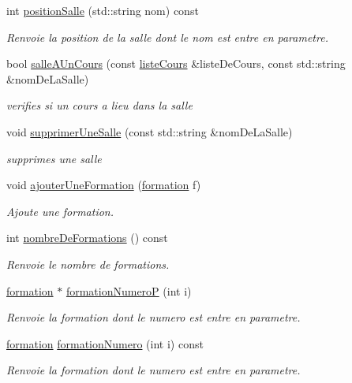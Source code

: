 \begin{DoxyCompactItemize}
int \hyperlink{classliste_ressources_ad4f9c36ed425f2a3d4ca161abd6198da}{position\+Salle} (std\+::string nom) const
\begin{DoxyCompactList}\small\item\em Renvoie la position de la salle dont le nom est entre en parametre. \end{DoxyCompactList}\item 
bool \hyperlink{classliste_ressources_a83834356f61b0106d3b2157afc363dc5}{salle\+A\+Un\+Cours} (const \hyperlink{classliste_cours}{liste\+Cours} \&liste\+De\+Cours, const std\+::string \&nom\+De\+La\+Salle)
\begin{DoxyCompactList}\small\item\em verifies si un cours a lieu dans la salle \end{DoxyCompactList}\item 
void \hyperlink{classliste_ressources_a364c27cbbbaa542d110d744e016cf092}{supprimer\+Une\+Salle} (const std\+::string \&nom\+De\+La\+Salle)
\begin{DoxyCompactList}\small\item\em supprimes une salle \end{DoxyCompactList}\item 
void \hyperlink{classliste_ressources_a3b12d0a99dedc81a6a9ddfde375f3c3e}{ajouter\+Une\+Formation} (\hyperlink{classformation}{formation} f)
\begin{DoxyCompactList}\small\item\em Ajoute une formation. \end{DoxyCompactList}\item 
int \hyperlink{classliste_ressources_a332aca734617587a463197043a058b02}{nombre\+De\+Formations} () const
\begin{DoxyCompactList}\small\item\em Renvoie le nombre de formations. \end{DoxyCompactList}\item 
\hyperlink{classformation}{formation} $\ast$ \hyperlink{classliste_ressources_a71ef69325d349c087c995f5aac9b9f27}{formation\+NumeroP} (int i)
\begin{DoxyCompactList}\small\item\em Renvoie la formation dont le numero est entre en parametre. \end{DoxyCompactList}\item 
\hyperlink{classformation}{formation} \hyperlink{classliste_ressources_aa0dc7c74caa61d02294c51fb79f7abe7}{formation\+Numero} (int i) const
\begin{DoxyCompactList}\small\item\em Renvoie la formation dont le numero est entre en parametre. \end{DoxyCompactList}\item 

\end{DoxyCompactItemize}

